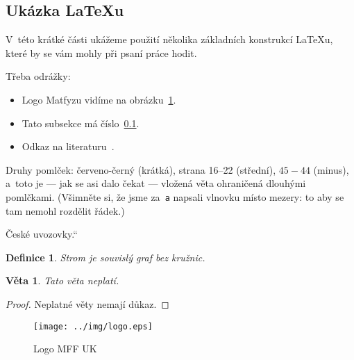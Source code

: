 
\subsection{Ukázka \LaTeX{}u}
\label{ssec:ukazka}

V~této krátké části ukážeme použití několika základních konstrukcí \LaTeX{}u,
které by se vám mohly při psaní práce hodit.

Třeba odrážky:

\begin{itemize}
\item Logo Matfyzu vidíme na obrázku~\ref{fig:mff}.
\item Tato subsekce má číslo~\ref{ssec:ukazka}.
\item Odkaz na literaturu~\cite{lamport94}.
\end{itemize}

Druhy pomlček:
červeno-černý (krátká),
strana 16--22 (střední),
$45-44$ (minus),
a~toto je --- jak se asi dalo čekat --- vložená věta ohraničená dlouhými pomlčkami.
(Všimněte si, že jsme za~\verb|a| napsali vlnovku místo mezery: to aby se
tam nemohl rozdělit řádek.)

\newcommand{\uv}[1]{\quotedblbase #1\textquotedblleft}
\uv{České uvozovky.}

\newtheorem{theorem}{Věta}
\newtheorem*{define}{Definice}	%

\begin{define}
{\sl Strom} je souvislý graf bez kružnic.
\end{define}

\begin{theorem}
Tato věta neplatí.
\end{theorem}

\begin{proof}
Neplatné věty nemají důkaz.
\end{proof}

\begin{figure}
	\centering
	\texttt{[image: ../img/logo.eps]}
	\caption{Logo MFF UK}
	\label{fig:mff}
\end{figure}
